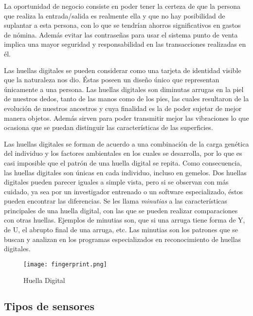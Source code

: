 La oportunidad de negocio consiste en poder tener la certeza de que la persona que realiza la entrada/salida es realmente ella y que no hay posibilidad de suplantar a esta persona, con lo que se tendrían ahorros significativos en gastos de nómina. Además evitar las contraseñas para usar el sistema punto de venta implica una mayor seguridad y responsabilidad en las transacciones realizadas en él.

Las huellas digitales se pueden considerar como una tarjeta de identidad visible que la naturaleza nos dio. Éstas poseen un diseño único que representan únicamente a una persona. Las huellas digitales son diminutas arrugas en la piel de nuestros dedos, tanto de las manos como de los pies, las cuales resultaron de la evolución de nuestros ancestros y cuya finalidad es la de poder sujetar de mejor manera objetos. Además sirven para poder transmitir mejor las vibraciones lo que ocasiona que se puedan distinguir las características de las superficies.

Las huellas digitales se forman de acuerdo a una combinación de la carga genética del individuo y los factores ambientales en los cuales se desarrolla, por lo que es casi imposible que el patrón de una huella digital se repita. Como consecuencia, las huellas digitales son únicas en cada individuo, incluso en gemelos. Dos huellas digitales pueden parecer iguales a simple vista, pero si se observan con más cuidado, ya sea por un investigador entrenado o un software especializado, éstos pueden encontrar las diferencias. Se les llama \textit{minutias} a las características principales de una huella digital, con las que se pueden realizar comparaciones con otras huellas. Ejemplos de minutias son, que si una arruga tiene forma de Y, de U, el abrupto final de una arruga, etc. Las minutias son los patrones que se buscan y analizan en los programas especializados en reconocimiento de huellas digitales.

\begin{figure}[htb]
 \begin{center}
  \texttt{[image: fingerprint.png]}
 \end{center}
 \caption{Huella Digital}
 \label{fig:finger_print_1}
\end{figure}


\subsection{Tipos de sensores}
\label{sec:fp_sensores}


